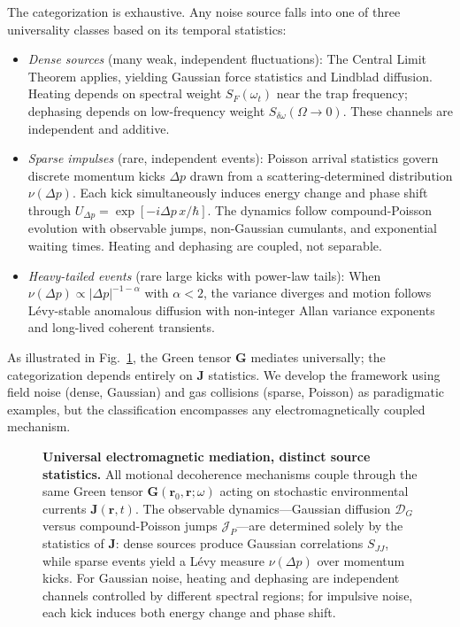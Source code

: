 The categorization is exhaustive. Any noise source falls into one of three universality classes based on its temporal statistics:
\begin{itemize}[leftmargin=*,nosep]
\item \emph{Dense sources} (many weak, independent fluctuations): The Central Limit Theorem applies, yielding Gaussian force statistics and Lindblad diffusion. Heating depends on spectral weight $S_F(\omega_t)$ near the trap frequency; dephasing depends on low-frequency weight $S_{\delta\omega}(\Omega \to 0)$. These channels are independent and additive.

\item \emph{Sparse impulses} (rare, independent events): Poisson arrival statistics govern discrete momentum kicks $\Delta p$ drawn from a scattering-determined distribution $\nu(\Delta p)$. Each kick simultaneously induces energy change and phase shift through $U_{\Delta p} = \exp[-i \Delta p \, x/\hbar]$. The dynamics follow compound-Poisson evolution with observable jumps, non-Gaussian cumulants, and exponential waiting times. Heating and dephasing are coupled, not separable.

\item \emph{Heavy-tailed events} (rare large kicks with power-law tails): When $\nu(\Delta p) \propto |\Delta p|^{-1-\alpha}$ with $\alpha < 2$, the variance diverges and motion follows L\'evy-stable anomalous diffusion with non-integer Allan variance exponents and long-lived coherent transients.
\end{itemize}

As illustrated in Fig.~\ref{fig:em_mediation}, the Green tensor $\mathbf{G}$ mediates universally; the categorization depends entirely on $\mathbf{J}$ statistics. We develop the framework using field noise (dense, Gaussian) and gas collisions (sparse, Poisson) as paradigmatic examples, but the classification encompasses any electromagnetically coupled mechanism.

\begin{figure}[t]
  \centering
  
  \caption{\textbf{Universal electromagnetic mediation, distinct source statistics.}
  All motional decoherence mechanisms couple through the same Green tensor $\mathbf{G}(\mathbf{r}_0,\mathbf{r};\omega)$ acting on stochastic environmental currents $\mathbf{J}(\mathbf{r},t)$. 
  The observable dynamics—Gaussian diffusion $\mathcal{D}_G$ versus compound-Poisson jumps $\mathcal{J}_P$—are determined solely by the statistics of $\mathbf{J}$: dense sources produce Gaussian correlations $S_{JJ}$, while sparse events yield a L\'evy measure $\nu(\Delta p)$ over momentum kicks. For Gaussian noise, heating and dephasing are independent channels controlled by different spectral regions; for impulsive noise, each kick induces both energy change and phase shift.}
  \label{fig:em_mediation}
\end{figure}

